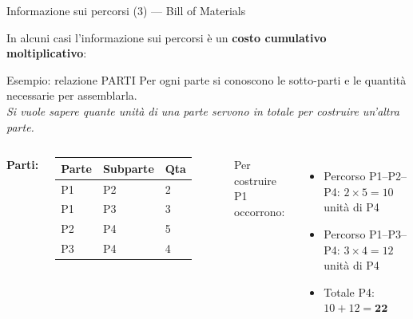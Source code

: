 \documentclass[aspectratio=169]{beamer}
\begin{document}
\begin{frame}{Informazione sui percorsi (3) — Bill of Materials}

In alcuni casi l'informazione sui percorsi è un \textbf{costo cumulativo moltiplicativo}:

\begin{block}{Esempio: relazione PARTI}
Per ogni parte si conoscono le sotto-parti e le quantità necessarie per assemblarla.\\
\textit{Si vuole sapere quante unità di una parte servono in totale per costruire un'altra parte.}
\end{block}

\vspace{8pt}
\begin{columns}[T]
\textbf{Parti:}\\[4pt]
\small
\begin{tabular}{|l|l|l|}
\hline
\textbf{Parte} & \textbf{Subparte} & \textbf{Qta}\\
\hline
P1 & P2 & 2 \\
P1 & P3 & 3 \\
P2 & P4 & 5 \\
P3 & P4 & 4 \\
\hline
\end{tabular}

\vspace{4pt}
Per costruire P1 occorrono:
\begin{itemize}
  \item Percorso P1--P2--P4: $2 \times 5 = 10$ unità di P4
  \item Percorso P1--P3--P4: $3 \times 4 = 12$ unità di P4
  \item Totale P4: $10 + 12 = \mathbf{22}$
\end{itemize}
\end{columns}

\end{frame}
\end{document}
